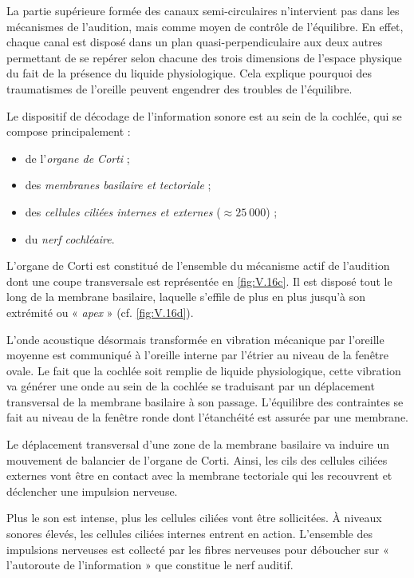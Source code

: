 La partie supérieure formée des canaux semi-circulaires n'intervient pas dans les mécanismes de l'audition, mais comme moyen de contrôle de l'équilibre. En effet, chaque canal est disposé dans un plan quasi-perpendiculaire aux deux autres permettant de se repérer selon chacune des trois dimensions de l'espace physique du fait de la présence du liquide physiologique. 
Cela explique pourquoi des traumatismes de l'oreille peuvent engendrer des troubles de l'équilibre.

Le dispositif de décodage de l'information sonore est au sein de la cochlée, qui se compose principalement :
\begin{itemize}
\item de l'\emph{organe de Corti} ;
\item des \emph{membranes basilaire et tectoriale} ;
\item des \emph{cellules ciliées internes et externes} ($\approx 25\:\!000$) ;
\item du \emph{nerf cochléaire}. %
\end{itemize}

L'organe de Corti est constitué de l'ensemble du mécanisme actif de l'audition dont une coupe transversale est représentée en \cref{fig:V.16c}. Il est disposé tout le long de la membrane basilaire, laquelle s'effile de plus en plus jusqu'à son extrémité ou « \emph{apex} » (cf. \cref{fig:V.16d}).

L'onde acoustique désormais transformée en vibration mécanique par l'oreille moyenne est communiqué à l'oreille interne par l'étrier au niveau de la fenêtre ovale. Le fait que la cochlée soit remplie de liquide physiologique, cette vibration va générer une onde au sein de la cochlée se traduisant par un déplacement transversal de la membrane basilaire à son passage. L'équilibre des contraintes se fait au niveau de la fenêtre ronde dont l’étanchéité est assurée par une membrane.

Le déplacement transversal d'une zone de la membrane basilaire va induire un mouvement de balancier de l'organe de Corti. Ainsi, les cils des cellules ciliées externes vont être en contact avec la membrane tectoriale qui les recouvrent et déclencher une impulsion nerveuse.

Plus le son est intense, plus les cellules ciliées vont être sollicitées. À niveaux sonores élevés, les cellules ciliées internes entrent en action. L'ensemble des impulsions nerveuses est collecté par les fibres nerveuses pour déboucher sur « l'autoroute de l'information » que constitue le nerf auditif.

